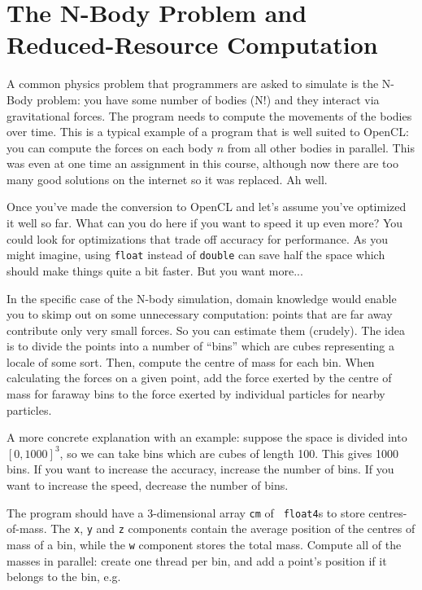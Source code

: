




\section*{The N-Body Problem and Reduced-Resource Computation}
A common physics problem that programmers are asked to simulate is the N-Body problem: you have some number of bodies (N!) and they interact via gravitational forces. The program needs to compute the movements of the bodies over time. This is a typical example of a program that is well suited to OpenCL: you can compute the forces on each body $n$ from all other bodies in parallel. This was even at one time an assignment in this course, although now there are too many good solutions on the internet so it was replaced. Ah well.

Once you've made the conversion to OpenCL and let's assume you've optimized it well so far. What can you do here if you want to speed it up even more? You could look for optimizations that trade off accuracy for performance. As you might imagine, using \texttt{float} instead of \texttt{double} can save half the space which should make things quite a bit faster. But you want more...

In the specific case of the N-body simulation,
domain knowledge would enable you to skimp out on
some unnecessary computation: points that are far away contribute only
very small forces. So you can estimate them (crudely). The idea is to divide the points into a number of ``bins'' which are cubes representing a locale of some sort. Then, compute the centre of mass for each bin. When calculating the forces on a given point, add the force exerted by the centre of mass for faraway bins to the force exerted by individual particles for nearby particles.

A more concrete explanation with an example: suppose the space  is divided into $[0, 1000]^3$, so we can take bins which are cubes of length 100. This gives 1000 bins. If you want to increase the accuracy, increase the number of bins. If you want to increase the speed, decrease the number of bins.

The program should have a 3-dimensional array {\tt cm} of {\tt
  float4}s to store centres-of-mass. The {\tt x}, {\tt y} and {\tt z}
components contain the average position of the centres of mass of a
bin, while the {\tt w} component stores the total mass. Compute all of
the masses in parallel: create one thread per bin, and add a point's
position if it belongs to the bin, e.g.

